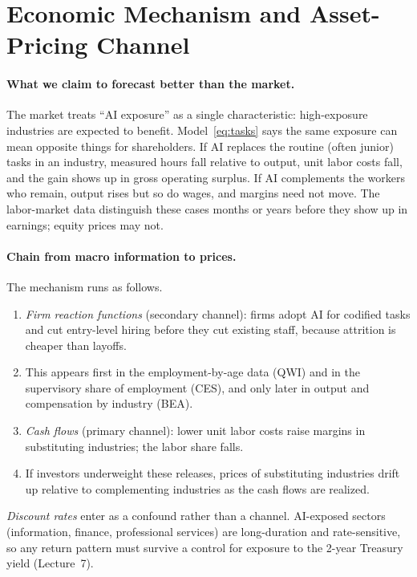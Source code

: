 \section{Economic Mechanism and Asset-Pricing Channel}
\label{sec:mechanism}

\paragraph{What we claim to forecast better than the market.} The market treats ``AI exposure'' as a single characteristic: high-exposure industries are expected to benefit. Model~\eqref{eq:tasks} says the same exposure can mean opposite things for shareholders. If AI replaces the routine (often junior) tasks in an industry, measured hours fall relative to output, unit labor costs fall, and the gain shows up in gross operating surplus. If AI complements the workers who remain, output rises but so do wages, and margins need not move. The labor-market data distinguish these cases months or years before they show up in earnings; equity prices may not.

\paragraph{Chain from macro information to prices.} The mechanism runs as follows.
\begin{enumerate}
  \item \emph{Firm reaction functions} (secondary channel): firms adopt AI for codified tasks and cut entry-level hiring before they cut existing staff, because attrition is cheaper than layoffs.
  \item This appears first in the employment-by-age data (QWI) and in the supervisory share of employment (CES), and only later in output and compensation by industry (BEA).
  \item \emph{Cash flows} (primary channel): lower unit labor costs raise margins in substituting industries; the labor share falls.
  \item If investors underweight these releases, prices of substituting industries drift up relative to complementing industries as the cash flows are realized.
\end{enumerate}
\emph{Discount rates} enter as a confound rather than a channel. AI-exposed sectors (information, finance, professional services) are long-duration and rate-sensitive, so any return pattern must survive a control for exposure to the 2-year Treasury yield (Lecture~7).

